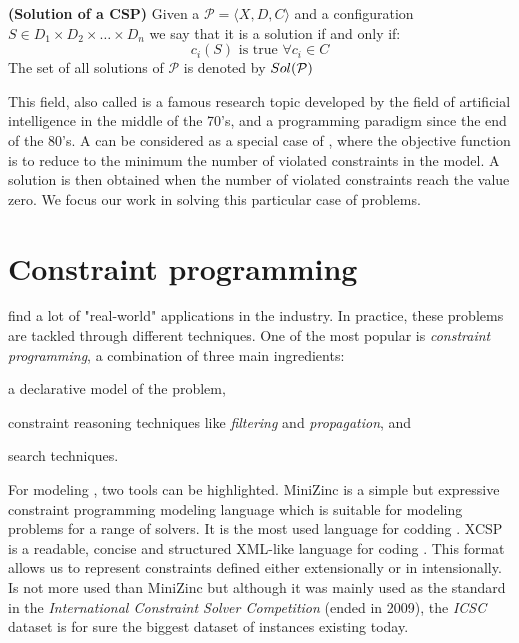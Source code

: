 \begin{definition}{\bf (Solution of a CSP)}
\label{solCSP}
Given a \csp{} $\mathcal{P}=\langle X,D,C \rangle$ and a configuration $S \in D_1\times D_2\times\dots\times D_n$ we say that it is a solution if and only if:	
\begin{equation*}
c_i\left(S\right)\text{ is true }\forall c_i \in C
\end{equation*}
The set of all solutions of $\mathcal{P}$ is denoted by $\mathnormal{Sol}(\mathcal{P})$
\end{definition}

This field, also called \CP{} is a famous research topic developed by the field of artificial intelligence in the middle of the 70's, and a programming paradigm since the end of the 80's. A \csp{} can be considered as a special case of \COPs, where the objective function is to reduce to the minimum the number of violated constraints in the model. A solution is then obtained when the number of violated constraints reach the value zero. We focus our work in solving this particular case of problems.

\section{Constraint programming}\label{sec:cp}

\csps{} find a lot of "real-world" applications in the industry. In practice, these problems are tackled through different techniques. One of the most popular is \textit{constraint programming}, a combination of three main ingredients: \begin{inparaenum}[i)] \item a declarative model of the problem, \item constraint reasoning techniques like \textit{filtering} and \textit{propagation}, and \item search techniques. \end{inparaenum} 

For modeling \csps{}, two tools can be highlighted. {\sc MiniZinc} is a simple but expressive constraint programming modeling language which is suitable for modeling problems for a range of solvers. It is the most used language for codding \csps{} \cite{Nethercote}. {\sc XCSP} is a readable, concise and structured XML-like language for coding \csps. This format allows us to represent constraints defined either extensionally or in intensionally. Is not more used than {\sc MiniZinc} but although it was mainly used as the standard in the {\it International Constraint Solver Competition} (ended in 2009), the {\it ICSC} dataset is for sure the biggest dataset of \csps{} instances existing today.

